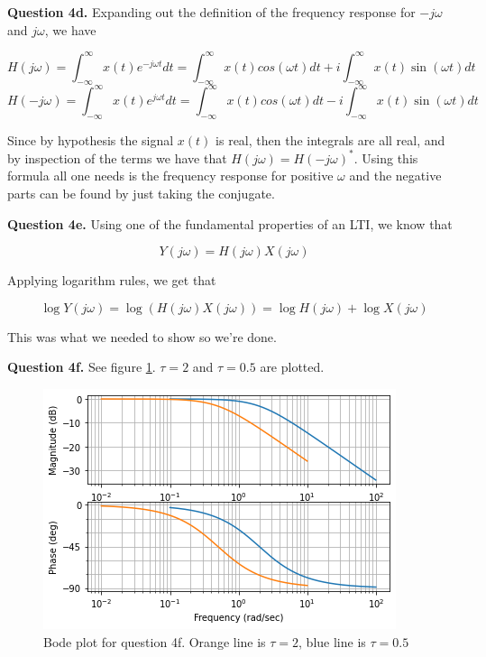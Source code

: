 \documentclass[letterpaper, reqno,11pt]{article}
\begin{document}
{\noindent\bf Question 4d.} Expanding out the definition of the frequency response for $-j\omega$ and $j\omega$, we have 

\[
    H(j\omega)=\int_{-\infty}^\infty x(t)e^{-j\omega t}dt=\int_{-\infty}^\infty x(t)cos(\omega t)dt+i\int_{-\infty}^\infty x(t)\sin(\omega t)dt
\]
\[
    H(-j\omega)=\int_{-\infty}^\infty x(t)e^{j\omega t}dt=\int_{-\infty}^\infty x(t)cos(\omega t)dt-i\int_{-\infty}^\infty x(t)\sin(\omega t)dt
\]

Since by hypothesis the signal $x(t)$ is real, then the integrals are all real, and by inspection of the terms we have that $H(j\omega)=H(-j\omega)^*$. Using this formula all one needs is the frequency response for positive $\omega$ and the negative parts can be found by just taking the conjugate. 

{\noindent\bf Question 4e.} Using one of the fundamental properties of an LTI, we know that 

\[
    Y(j\omega)=H(j\omega)X(j\omega)
\]

Applying logarithm rules, we get that 

\[
    \log Y(j\omega)=\log(H(j\omega)X(j\omega))=\log H(j\omega)+\log X(j\omega)
\]

This was what we needed to show so we're done. 

{\noindent\bf Question 4f.} See figure \ref{fig:q4f}. $\tau=2$ and $\tau=0.5$ are plotted. 

\begin{figure}[htbp]
\centering
\includegraphics[width=\textwidth]{q4f}
\caption{Bode plot for question 4f. Orange line is $\tau=2$, blue line is $\tau=0.5$}
\label{fig:q4f}
\end{figure}
\end{document}
